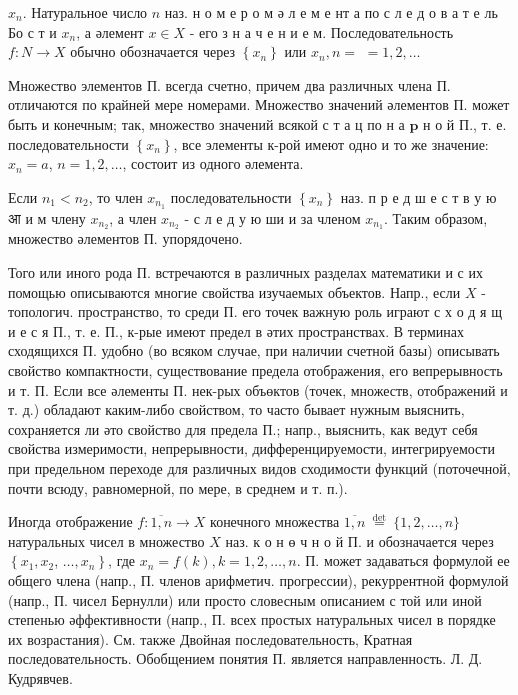 \documentclass[10pt]{article}
\begin{document}
$x_{n}$. Натуральное число $n$ наз. н о м е р о м ә л е м е нт а по с л е д о в а т е ль Бо с т и $x_{n}$, а әлемент $x \in X$ - его з н а ч е н и е м. Последовательность $f: N \rightarrow X$ обычно обозначается через $\left\{x_{n}\right\}$ или $x_{n}, n=$ $=1,2, \ldots$



Множество элементов П. всегда счетно, причем два различных члена П. отличаются по крайней мере номерами. Множество значений әлементов П. может быть и конечным; так, множество значений всякой с т а ц по н а $\mathbf{p}$ н о й П., т. е. последовательности $\left\{x_{n}\right\}$, все элементы к-рой имеют одно и то же значение: $x_{n}=a$, $n=1,2, \ldots$, состоит из одного әлемента.



Если $n_{1}<n_{2}$, то член $x_{n_{1}}$ последовательности $\left\{x_{n}\right\}$ наз. п р е д ш е с т в у ю आ и м члену $x_{n_{2}}$, а член $x_{n_{2}}$ - с л е д у ю ши и за членом $x_{n_{1}}$. Таким образом, множество әлементов П. упорядочено.



Того или иного рода П. встречаются в различных разделах математики и с их помощью описываются многие свойства изучаемых объектов. Напр., если $X$ - топологич. пространство, то среди П. его точек важную роль играют с х о д я щ и е с я П., т. е. П., к-рые имеют предел в әтих пространствах. В терминах сходящихся П. удобно (во всяком случае, при наличии счетной базы) описывать свойство компактности, существование предела отображения, его вепрерывность и т. П. Если все әлементы П. нек-рых объөктов (точек, множеств, отображений и т. д.) обладают каким-либо свойством, то часто бывает нужным выяснить, сохраняется ли әто свойство для предела П.; напр., выяснить, как ведут себя свойства измеримости, непрерывности, дифференцируемости, интегрируемости при предельном переходе для различных видов сходимости функций (поточечной, почти всюду, равномерной, по мере, в среднем и т. п.).



Иногда отображение $f: \overline{1, n} \rightarrow X$ конечного множества $\overline{1, n} \stackrel{\text { det }}{=}\{1,2, \ldots, n\}$ натуральных чисел в множество $X$ наз. к о н ө ч н о й П. и обозначается через $\left\{x_{1}, x_{2}\right.$, $\left.\ldots, x_{n}\right\}$, где $x_{n}=f(k), k=1,2, \ldots, n$. П. может задаваться формулой ее общего члена (напр., П. членов арифметич. прогрессии), рекуррентной формулой (напр., П. чисел Бернулли) или просто словесным описанием с той или иной степенью әффективности (напр., П. всех простых натуральных чисел в порядке их возрастания). См. также Двойная последовательность, Кратная последовательность. Обобщением понятия П. является направленность. Л. Д. Кудрявчев.
\end{document}
